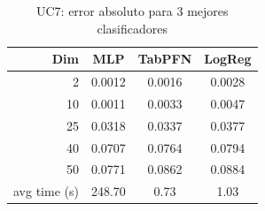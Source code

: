 \begin{table}[ht]
\centering
\caption{UC7: error absoluto para 3 mejores clasificadores}
\label{tab:uc7_compact_top3}
\begin{tabular}{rccc}
\toprule
Dim & MLP & TabPFN & LogReg \\
\midrule
2 & 0.0012 & 0.0016 & 0.0028 \\
10 & 0.0011 & 0.0033 & 0.0047 \\
25 & 0.0318 & 0.0337 & 0.0377 \\
40 & 0.0707 & 0.0764 & 0.0794 \\
50 & 0.0771 & 0.0862 & 0.0884 \\
avg time (s) & 248.70 & 0.73 & 1.03 \\
\bottomrule
\end{tabular}

\end{table}